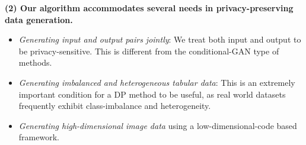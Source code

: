 \documentclass{article}
\begin{document}
\textbf{(2) Our algorithm accommodates several needs in privacy-preserving data generation.} 
    \begin{itemize}
        \item \textit{Generating input and output pairs jointly}:
        We treat both input and output to be privacy-sensitive.  This is different from the conditional-GAN type of methods. %
        \item \textit{Generating imbalanced and heterogeneous tabular data}: This is an extremely important condition for a DP method to be useful, as real world datasets frequently exhibit class-imbalance and heterogeneity.
        \item \textit{Generating high-dimensional image data} using a low-dimensional-code based framework.  %
    \end{itemize}
    
\end{document}
